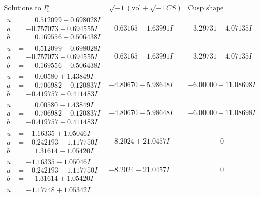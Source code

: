\documentclass[1p]{elsarticle_modified}
\theoremstyle{definition}
\newcommand{\I}{\sqrt{-1}}
\begin{document}
$$\begin{array}{c|c|c}  
\text{Solutions to }I^u_{1}& \I (\text{vol} + \sqrt{-1}CS) & \text{Cusp shape}\\
 \hline 
\begin{aligned}
u &= \phantom{-}0.512099 + 0.698028 I \\
a &= -0.757073 - 0.694555 I \\
b &= \phantom{-}0.169556 + 0.506438 I\end{aligned}
 & -0.63165 - 1.63991 I & -3.29731 + 4.07135 I \\ \hline\begin{aligned}
u &= \phantom{-}0.512099 - 0.698028 I \\
a &= -0.757073 + 0.694555 I \\
b &= \phantom{-}0.169556 - 0.506438 I\end{aligned}
 & -0.63165 + 1.63991 I & -3.29731 - 4.07135 I \\ \hline\begin{aligned}
u &= \phantom{-}0.00580 + 1.43849 I \\
a &= \phantom{-}0.706982 + 0.120837 I \\
b &= -0.419757 - 0.411483 I\end{aligned}
 & -4.80670 - 5.98648 I & -6.00000 + 11.08698 I \\ \hline\begin{aligned}
u &= \phantom{-}0.00580 - 1.43849 I \\
a &= \phantom{-}0.706982 - 0.120837 I \\
b &= -0.419757 + 0.411483 I\end{aligned}
 & -4.80670 + 5.98648 I & -6.00000 - 11.08698 I \\ \hline\begin{aligned}
u &= -1.16335 + 1.05046 I \\
a &= -0.242193 + 1.117750 I \\
b &= \phantom{-}1.31614 - 1.05420 I\end{aligned}
 & -8.2024 + 21.0457 I & \phantom{-0.000000 } 0 \\ \hline\begin{aligned}
u &= -1.16335 - 1.05046 I \\
a &= -0.242193 - 1.117750 I \\
b &= \phantom{-}1.31614 + 1.05420 I\end{aligned}
 & -8.2024 - 21.0457 I & \phantom{-0.000000 } 0 \\ \hline\begin{aligned}
u &= -1.17748 + 1.05342 I \\

\end{aligned}
\end{array}$$
\end{document}
